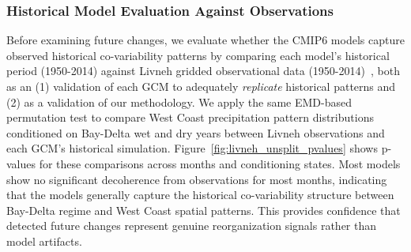 
\subsubsection{Historical Model Evaluation Against Observations}

Before examining future changes, we evaluate whether the CMIP6 models capture observed historical co-variability patterns by comparing each model's historical period (1950-2014) against Livneh gridded observational data (1950-2014)~\cite{pierce2021extreme}, both as an (1) validation of each GCM to adequately \emph{replicate} historical patterns and (2) as a validation of our methodology.
%
We apply the same EMD-based permutation test to compare West Coast precipitation pattern distributions conditioned on Bay-Delta wet and dry years between Livneh observations and each GCM's historical simulation.
%
Figure~\ref{fig:livneh_unsplit_pvalues} shows p-values for these comparisons across months and conditioning states.
%
Most models show no significant decoherence from observations for most months, indicating that the models generally capture the historical co-variability structure between Bay-Delta regime and West Coast spatial patterns.
%
This provides confidence that detected future changes represent genuine reorganization signals rather than model artifacts.
%

